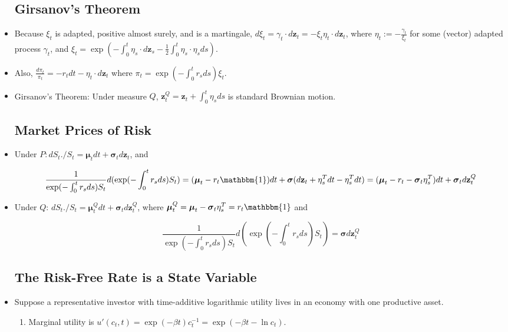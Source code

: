 \documentclass{article}
\newcommand{\zbf}{\mathbf{z}}
\newcommand{\mubf}{\boldsymbol{\mu}}
\newcommand{\sigmabf}{\boldsymbol{\sigma}}
\newcommand{\onebf}{\mathbbm{1}}
\begin{document}
\begin{itemize}
\subsection*{Girsanov's Theorem}

\item Because $\xi_t$ is adapted, positive almost surely, and is a martingale, $d \xi_t = \gamma_t \cdot d \zbf_t = -\xi_t \eta_t \cdot d \zbf_t$, where $\eta_t := - \frac{\gamma_t}{\xi_t}$ for some (vector) adapted process $\gamma_t$, and $\xi_t = \exp(-\int_0^t \eta_s \cdot d\zbf_s - \frac{1}{2} \int_0^t \eta_s \cdot \eta_s ds)$.

\item Also, $\frac{d \pi_t}{\pi_t} = -r_t dt - \eta_t \cdot d \zbf_t$ where $\pi_t = \exp(-\int_0^t r_s ds) \xi_t$.

\item Girsanov's Theorem: Under measure $Q$, $\zbf_t^Q = \zbf_t + \int_0^t \eta_s ds$ is standard Brownian motion.

\subsection*{Market Prices of Risk}

\item Under $P: dS_t./ S_t = \mubf_t dt +\sigmabf_t d\zbf_t$, and 

$$
\frac{1}{\exp(-\int_0^t r_s ds) S_t} d(\exp(-\int_0^t r_s ds) S_t) = (\mubf_t - r_t \onebf) dt + \sigmabf (d\zbf_t + \eta_s^T dt - \eta_s^T dt) = (\mubf_t - r_t -\sigmabf_t \eta_s^T) dt + \sigmabf_t d\zbf_t^Q
$$

\item Under $Q$: $dS_t./S_t = \mubf_t^Q dt + \sigmabf_t d\zbf_t^Q$, where $\mubf_t^Q = \mubf_t - \sigmabf_t \eta_s^T = r_t \onebf$ and 

$$
\frac{1}{\exp(-\int_0^t r_s ds) S_t} d(\exp(-\int_0^t r_s ds) S_t) = \sigmabf d \zbf_t^Q
$$

\subsection*{The Risk-Free Rate is a State Variable}

\item Suppose a representative investor with time-additive logarithmic utility lives in an economy with one productive asset.

\begin{enumerate}

\item Marginal utility is $u'(c_t, t) = \exp(-\beta t) c_t^{-1} = \exp(-\beta t - \ln c_t)$.


\end{enumerate}
\end{itemize}
\end{document}
